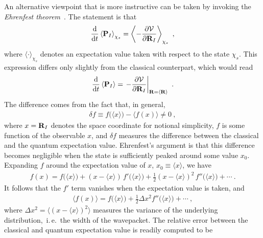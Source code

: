 An alternative viewpoint that is more instructive can be taken by invoking the \emph{Ehrenfest theorem}~\cite{Ehrenfest1927,Basdevant2007}. The statement is that
\begin{align}
  \frac{{\rm d}}{{\rm d} t} \left\langle {\bf P}_I \right\rangle_{\chi_s}
    = \left\langle
      - \frac{\partial \mathcal{V}}{\partial {\bf R}_I}
    \right\rangle_{\chi_s}~,
  \label{eq:ehrenfest.de1}
\end{align}
where $\langle \cdot \rangle_{\chi_s}$ denotes an expectation value taken with respect to the state $\chi_s$. This expression differs only slightly from the classical counterpart, which would read
\begin{align}
\frac{{\rm d}}{{\rm d} t} \left\langle {\bf P}_I \right\rangle
= \left.
- \frac{\partial \mathcal{V}}{\partial {\bf R}_I}
\right\vert_{{\bf R} = \langle {\bf R} \rangle}~.
\label{eq:ehrenfest.de2}
\end{align}
The difference comes from the fact that, in general,
\begin{align}
  \delta f
  \equiv 
  f \bm ( \langle x \rangle \bm{)} 
  - 
  \bm{\langle} f (x) \bm{\rangle}
  \neq 0
  ~,
  \label{eq:ehrenfest.delta1}
\end{align}
where $x = {\bf R}_I$ denotes the space coordinate for notional simplicity, $f$ is some function of the observable $x$, and $\delta f$ measures the difference between the classical and the quantum expectation value. Ehrenfest's argument is that this difference becomes negligible when the state is sufficiently peaked around some value $x_0$. Expanding $f$ around the expectation value of $x$, $x_0 \equiv \langle x \rangle$, we have
\begin{align}
  f(x) = f \bm ( \langle x \rangle \bm{)}  
    + (x - \langle x \rangle) \, f' \bm ( \langle x \rangle \bm{)}
    + \frac{1}{2} (x - \langle x \rangle)^2 \, f'' \bm ( \langle x \rangle \bm{)}
    + \cdots~.
  \label{eq:ehrenfest.f2}
\end{align}
It follows that the $f'$ term vanishes when the expectation value is taken, and
\begin{align}
\langle f(x) \rangle 
  = f \bm ( \langle x \rangle \bm{)}  
    + \frac{1}{2} \Delta x^2 f'' \bm ( \langle x \rangle \bm{)}
    + \cdots~,
\label{eq:ehrenfest.f3}
\end{align}
where $\Delta x^2 = \bm{\langle} (x - \langle x \rangle)^2 \bm{\rangle}$ measures the variance of the underlying distribution,~i.\,e.~the width of the wavepacket. The relative error between the classical and quantum expectation value is readily computed to be
